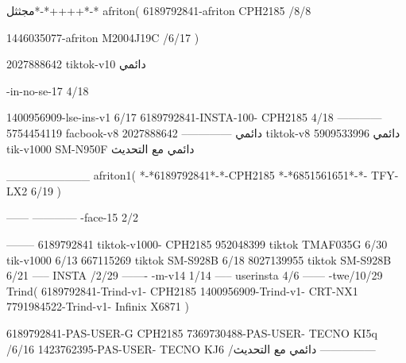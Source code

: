 مجثثل*-*++++*-*
afriton(
6189792841-afriton CPH2185  /8/8

1446035077-afriton M2004J19C  /6/17
)

2027888642 tiktok-v10
دائمي

-in-no-se-17 4/18

1400956909-lse-ins-v1 6/17
6189792841-INSTA-100- CPH2185 4/18
------------
5754454119 facbook-v8
دائمي
--------------
2027888642 tiktok-v8
دائمي
5909533996 tik-v1000  SM-N950F
دائمي مع التحديث

__________
afriton1(
*-*6189792841*-*-CPH2185
*-*6851561651*-*- TFY-LX2  6/19
)


------
------------
-face-15 2/2

--------
6189792841 tiktok-v1000- CPH2185 
952048399 tiktok TMAF035G  6/30
 tik-v1000   6/13
667115269 tiktok SM-S928B  6/18
8027139955 tiktok SM-S928B  6/21
-----
 INSTA /2/29
-------
-m-v14 1/14
-----
userinsta 4/6
------
-twe/10/29
Trind(
6189792841-Trind-v1- CPH2185 
1400956909-Trind-v1- CRT-NX1 \6
7791984522-Trind-v1- Infinix X6871 \6
)


6189792841-PAS-USER-G CPH2185 
7369730488-PAS-USER- TECNO KI5q  /6/16
1423762395-PAS-USER- TECNO KJ6  /دائمي مع التحديث
    ---------------
